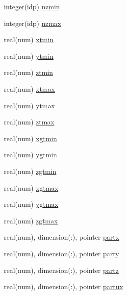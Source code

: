\begin{DoxyCompactItemize}
\item 
integer(idp) \hyperlink{namespacepython__pointers_a6de008bd6827979eb76463e5da2f857e}{nzmin}
\item 
integer(idp) \hyperlink{namespacepython__pointers_a9121a35b32fac876b7a6998f6d800fab}{nzmax}
\item 
real(num) \hyperlink{namespacepython__pointers_a69aa08a8bf01ef8d66b81af67f750a9d}{xtmin}
\item 
real(num) \hyperlink{namespacepython__pointers_ad4774639ad0f7fe1b23fea26a713fe6b}{ytmin}
\item 
real(num) \hyperlink{namespacepython__pointers_a470d148a146f86953442dca5976e24f7}{ztmin}
\item 
real(num) \hyperlink{namespacepython__pointers_a56c274f81ac2851fba9fe7397de6fc1b}{xtmax}
\item 
real(num) \hyperlink{namespacepython__pointers_a478abc5845abd884152862914f9bca98}{ytmax}
\item 
real(num) \hyperlink{namespacepython__pointers_a6feb09553974412979ed666ae061a1cb}{ztmax}
\item 
real(num) \hyperlink{namespacepython__pointers_a266c35c60dfb7d7891fc0b15d3484f16}{xgtmin}
\item 
real(num) \hyperlink{namespacepython__pointers_a131c8981c4a0437d422682375f4acfab}{ygtmin}
\item 
real(num) \hyperlink{namespacepython__pointers_ac782e4d3b6e67b7391a8c6f03617f937}{zgtmin}
\item 
real(num) \hyperlink{namespacepython__pointers_ae4ae1714533add4e893ccdb25fb89854}{xgtmax}
\item 
real(num) \hyperlink{namespacepython__pointers_a38ecc0e758a6b67f7aecb055e03927a1}{ygtmax}
\item 
real(num) \hyperlink{namespacepython__pointers_a46b682b61a01fee0e8b0c9aa64e9a59b}{zgtmax}
\item 
real(num), dimension(\+:), pointer \hyperlink{namespacepython__pointers_a11c207d7f4fb2d96dad5a926172277df}{partx}
\item 
real(num), dimension(\+:), pointer \hyperlink{namespacepython__pointers_a7ed293531cd47aefba8bd76e2692c30d}{party}
\item 
real(num), dimension(\+:), pointer \hyperlink{namespacepython__pointers_a318b3d65ffe6c40b81bae433e093df16}{partz}
\item 
real(num), dimension(\+:), pointer \hyperlink{namespacepython__pointers_a733cff77ba19e5a06a73224fe9f53542}{partux}
\item 

\end{DoxyCompactItemize}
